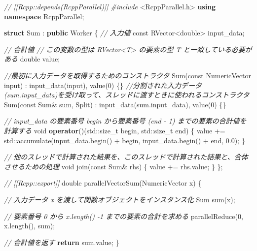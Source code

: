 \documentclass[]{book}
\newenvironment{Shaded}{\begin{snugshade}}{\end{snugshade}}
\newcommand{\AttributeTok}[1]{\textcolor[rgb]{0.77,0.63,0.00}{#1}}
\newcommand{\BuiltInTok}[1]{#1}
\newcommand{\CommentTok}[1]{\textcolor[rgb]{0.56,0.35,0.01}{\textit{#1}}}
\newcommand{\ControlFlowTok}[1]{\textcolor[rgb]{0.13,0.29,0.53}{\textbf{#1}}}
\newcommand{\DataTypeTok}[1]{\textcolor[rgb]{0.13,0.29,0.53}{#1}}
\newcommand{\DecValTok}[1]{\textcolor[rgb]{0.00,0.00,0.81}{#1}}
\newcommand{\FloatTok}[1]{\textcolor[rgb]{0.00,0.00,0.81}{#1}}
\newcommand{\ImportTok}[1]{#1}
\newcommand{\KeywordTok}[1]{\textcolor[rgb]{0.13,0.29,0.53}{\textbf{#1}}}
\newcommand{\NormalTok}[1]{#1}
\newcommand{\PreprocessorTok}[1]{\textcolor[rgb]{0.56,0.35,0.01}{\textit{#1}}}
\begin{document}
\begin{Shaded}
\begin{Highlighting}[]
\CommentTok{// [[Rcpp::depends(RcppParallel)]]}
\PreprocessorTok{#include }\ImportTok{<RcppParallel.h>}
\KeywordTok{using} \KeywordTok{namespace}\NormalTok{ RcppParallel;}

\KeywordTok{struct}\NormalTok{ Sum : }\KeywordTok{public}\NormalTok{ Worker}
\NormalTok{\{   }
  \CommentTok{// 入力値}
  \AttributeTok{const}\NormalTok{ RVector<}\DataTypeTok{double}\NormalTok{> input_data;}
  
  \CommentTok{// 合計値}
  \CommentTok{// この変数の型は RVector<T> の要素の型 T と一致している必要がある}
  \DataTypeTok{double}\NormalTok{ value;}
  
  \CommentTok{//最初に入力データを取得するためのコンストラクタ}
\NormalTok{  Sum(}\AttributeTok{const}\NormalTok{ NumericVector input) : input_data(input), value(}\DecValTok{0}\NormalTok{) \{\}}
  \CommentTok{//分割された入力データ(sum.input_data)を受け取って、スレッドに渡すときに使われるコンストラクタ}
\NormalTok{  Sum(}\AttributeTok{const}\NormalTok{ Sum& sum, Split) : input_data(sum.input_data), value(}\DecValTok{0}\NormalTok{) \{\} }
  
  
  \CommentTok{// input_data の要素番号 begin から要素番号 (end - 1) までの要素の合計値を計算する }
  \DataTypeTok{void} \KeywordTok{operator}\NormalTok{()(}\BuiltInTok{std::}\NormalTok{size_t begin, }\BuiltInTok{std::}\NormalTok{size_t end) \{}
\NormalTok{    value += }\BuiltInTok{std::}\NormalTok{accumulate(input_data.begin() + begin, input_data.begin() + end, }\FloatTok{0.0}\NormalTok{);}
\NormalTok{  \}}
  
  \CommentTok{// 他のスレッドで計算された結果を、このスレッドで計算された結果と、合体させるための処理}
  \DataTypeTok{void}\NormalTok{ join(}\AttributeTok{const}\NormalTok{ Sum& rhs) \{ }
\NormalTok{    value += rhs.value; }
\NormalTok{  \}}
\NormalTok{\};}



\CommentTok{// [[Rcpp::export]]}
\DataTypeTok{double}\NormalTok{ parallelVectorSum(NumericVector x) \{}
  
  \CommentTok{// 入力データ x を渡して関数オブジェクトをインスタンス化}
\NormalTok{  Sum sum(x);}
  
  \CommentTok{// 要素番号 0 から x.length() -1 までの要素の合計を求める}
\NormalTok{  parallelReduce(}\DecValTok{0}\NormalTok{, x.length(), sum);}
  
  \CommentTok{// 合計値を返す}
  \ControlFlowTok{return}\NormalTok{ sum.value;}
\NormalTok{\}}
\end{Highlighting}
\end{Shaded}
\end{document}
